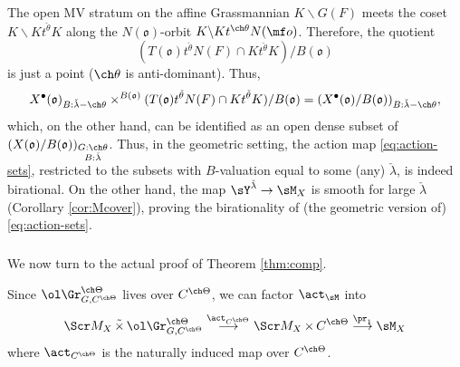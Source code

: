 \documentclass[final]{amsart}
\theoremstyle{remark}
\theoremstyle{definition}
\DeclareMathOperator*{\ttimes}{\tilde\times}
\DeclareMathOperator*{\xt}{\times}
\numberwithin{equation}{section}
\begin{document}
The open MV stratum on the affine Grassmannian $K\backslash G(F)$ meets the coset $K\backslash K t^{\check\theta} K$ along the $N(\mathfrak o)$-orbit $K \backslash K t^{\ch\theta} N(\mf o)$. Therefore, the quotient
\[(T(\mathfrak o)t^{\check\theta} N(F) \cap K t^{\check\theta} K)/B(\mathfrak o)\]
is just a point ($\ch\theta$ is anti-dominant).
Thus, 
\[X^\bullet(\mathfrak o)_{B:\check\lambda-\ch\theta} \times^{B(\mathfrak o)} (T(\mathfrak o) t^{\check\theta} N(F) \cap K t^{\check\theta} K)/B(\mathfrak o) = (X^\bullet(\mathfrak o)/B(\mathfrak o))_{B:\check\lambda-\ch\theta},\]
which, on the other hand, can be identified as an open dense subset of $(X(\mathfrak o)/B(\mathfrak o))_{\substack{G:\ch\theta \\ B:\check\lambda}}$. Thus, in the geometric setting, the action map \eqref{eq:action-sets}, restricted to the subsets with $B$-valuation equal to some (any) $\check\lambda$, is indeed birational. On the other hand, the map $\sY^{\check\lambda}\to \sM_X$ is smooth for large $\check\lambda$ (Corollary \ref{cor:Mcover}), proving the birationality of (the geometric version of) \eqref{eq:action-sets}.








\subsubsection{}

We now turn to the actual proof of Theorem \ref{thm:comp}.

Since $\ol\Gr^{\ch\Theta}_{G,C^{\ch\Theta}}$ lives over $C^{\ch\Theta}$, 
we can factor $\act_\sM$ into 
\begin{equation} \label{e:actC}
    \Scr M_X \ttimes \ol\Gr^{\ch\Theta}_{G,C^{\ch\Theta}} \overset{\act_{C^{\ch\Theta}}}\longrightarrow \Scr M_X \xt C^{\ch\Theta}
\overset{\pr_1}\longrightarrow \sM_X
\end{equation}
where $\act_{C^{\ch\Theta}}$ is the naturally induced map over $C^{\ch\Theta}$.
\end{document}
